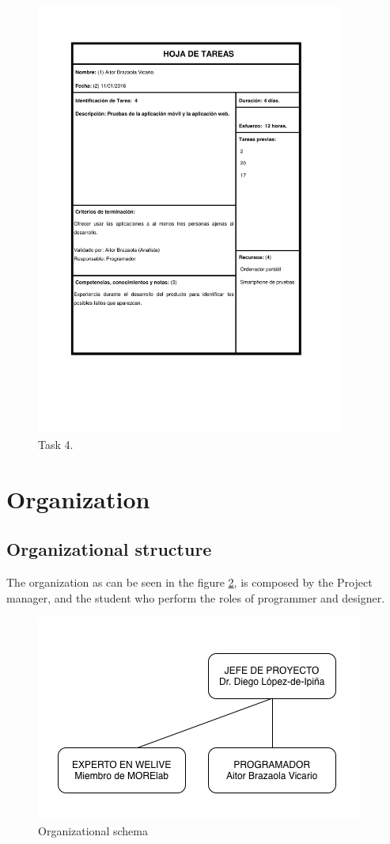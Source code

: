 \documentclass{DeustoFDP}
\begin{document}
\begin{figure}[H]
	\centering
	\includegraphics[width=0.9\textwidth]{fig/Tareas/4}
	\caption{Task 4.}
	\label{fig:t4}
\end{figure}
\section{Organization}
\subsection{Organizational structure}
The organization as can be seen in the figure \ref{fig:esquemaorganizacion}, is composed by the Project manager, and the student who perform the roles of programmer and designer.

\begin{figure}[h]
	\centering
	\includegraphics[width=0.7\linewidth]{fig/esquemaorganizacion}
	\caption[Organizational schema]{Organizational schema}
	\label{fig:esquemaorganizacion}
\end{figure}
\end{document}
